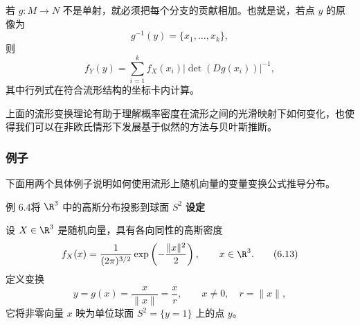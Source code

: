 若 $g\colon M\to N$ 不是单射，就必须把每个分支的贡献相加。也就是说，若点 $y$ 的原像为
\[
  g^{-1}(y)=\{x_1,\ldots,x_k\},
\]
则
\[
  f_Y(y)=\sum_{i=1}^{k}f_X(x_i)\bigl|\det(Dg(x_i))\bigr|^{-1},
\]
其中行列式在符合流形结构的坐标卡内计算。

上面的流形变换理论有助于理解概率密度在流形之间的光滑映射下如何变化，也使得我们可以在非欧氏情形下发展基于似然的方法与贝叶斯推断。

\subsubsection{例子}

下面用两个具体例子说明如何使用流形上随机向量的变量变换公式推导分布。

\begin{statement}{例 6.4}{将 $\R^3$ 中的高斯分布投影到球面 $S^2$}
\textbf{设定}\par
设 $X\in\R^3$ 是随机向量，具有各向同性的高斯密度
\begin{equation*}
  f_X(x)=\frac{1}{(2\pi)^{3/2}}\exp\left(-\frac{\lVert x\rVert^2}{2}\right),
  \qquad x\in\R^3.
  \tag{6.13}\label{eq:6.13}
\end{equation*}
定义变换
\[
  y=g(x)=\frac{x}{\lVert x\rVert}=\frac{x}{r},\qquad
  x\ne 0,\quad r=\lVert x\rVert,
\]
它将非零向量 $x$ 映为单位球面 $S^2=\{y=1\}$ 上的点 $y$。


\end{statement}
